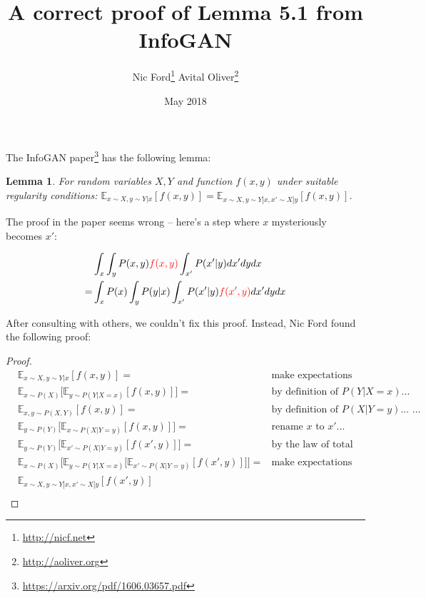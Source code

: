\documentclass{article}
\title{A correct proof of Lemma 5.1 from InfoGAN
}
\author{Nic Ford\footnote{\url{http://nicf.net}} \cr Avital Oliver\footnote{\url{http://aoliver.org}}}
\date{May 2018}
\newtheorem{lemma}[theorem]{Lemma}
\begin{document}
\maketitle

The InfoGAN paper\footnote{\url{https://arxiv.org/pdf/1606.03657.pdf}} has the following lemma:

\setcounter{section}{5}

\begin{lemma}
For random variables $X, Y$ and function $f(x, y)$ under suitable regularity conditions:
$\mathbb{E}_{x \sim X, y \sim Y|x}[f(x, y)] = 
 \mathbb{E}_{x \sim X, y \sim Y|x, x' \sim X|y}[f(x, y)]$.
\end{lemma}

The proof in the paper seems wrong -- here's a step where $x$ mysteriously becomes $x'$:

\begin{align*}
& \int_x \int_y P(x,y) {\color{red} f(x,y)} \int_{x'} P(x' | y)dx'dydx \\
= & \int_x P(x) \int_y P(y|x) \int_{x'} P(x'|y) {\color{red} f(x',y)} dx' dy dx
\end{align*}

After consulting with others, we couldn't fix this proof. Instead, Nic Ford found the following proof:

\begin{proof}
\begin{align*}
   & \mathbb{E}_{x \sim X,y \sim Y|x}[f(x, y)] = & \mbox{make expectations explicit...} \\
   & \mathbb{E}_{x \sim P(X)}\big[\mathbb{E}_{y \sim P(Y|X=x)}[f(x, y)]\big] = & \mbox{by definition of $P(Y|X=x)$...} \\
   & \mathbb{E}_{x,y \sim P(X,Y)}[f(x, y)] = & \mbox{by definition of $P(X|Y=y)$... ...} \\
   & \mathbb{E}_{y \sim P(Y)}\big[\mathbb{E}_{x \sim P(X|Y=y)}[f(x, y)]\big] = & \mbox{rename $x$ to $x'$...} \\
   & \mathbb{E}_{y \sim P(Y)}\big[\mathbb{E}_{x' \sim P(X|Y=y)}[f(x', y)]\big] = & \mbox{by the law of total expectation...} \\
   & \mathbb{E}_{x \sim P(X)}\Big[\mathbb{E}_{y \sim P(Y|X=x)}\big[\mathbb{E}_{x' \sim P(X|Y=y)}[f(x', y)]\big]\Big] = &  \mbox{make expectations implicit...} \\
   & \mathbb{E}_{x \sim X,y \sim Y|x,x' \sim X|y}[f(x', y)] & \\
\end{align*}
\end{proof}
\end{document}
